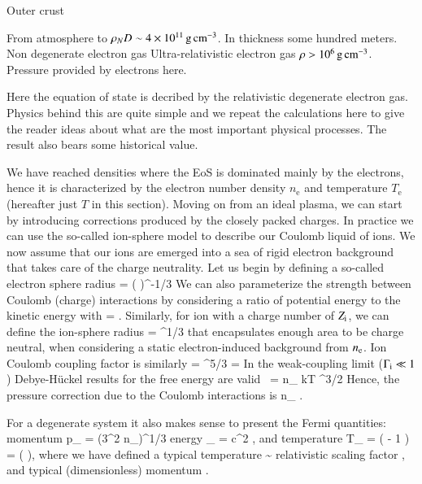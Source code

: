 Outer crust

From atmosphere to $\rho_ND \sim 4 \times 10^{11} \, \mathrm{g}\,\mathrm{cm}^{-3} $.
In thickness some hundred meters.
Non degenerate electron gas
Ultra-relativistic electron gas $\rho > 10^6 \, \mathrm{g}\,\mathrm{cm}^{-3} $.
Pressure provided by electrons here.

Here the equation of state is decribed by the relativistic degenerate electron gas.
Physics behind this are quite simple and we repeat the calculations here to give the reader ideas about what are the most important physical processes.
The result also bears some historical value.

We have reached densities where the EoS is dominated mainly by the electrons, hence it is characterized by the electron number density $n_{\mathrm{e}}$ and temperature $T_{\mathrm{e}}$ (hereafter just $T$ in this section).
Moving on from an ideal plasma, we can start by introducing corrections produced by the closely packed charges.
In practice we can use the so-called ion-sphere model to describe our Coulomb liquid of ions.
We now assume that our ions are emerged into a sea of rigid electron background that takes care of the charge neutrality.
Let us begin by defining a so-called electron sphere radius
\be
\erad = \left(  \right)^{-1/3}
\ee
We can also parameterize the strength between Coulomb (charge) interactions by considering a ratio of potential energy to the kinetic energy with
\be
\Ge = .
\ee
Similarly, for ion with a charge number of $Z_{\mathrm{i}}$, we can define the ion-sphere radius
\be
\irad = \erad \Zi^{1/3}
\ee
that encapsulates enough area to be charge neutral, when considering a static electron-induced background from $n_{\mathrm{e}}$.
Ion Coulomb coupling factor is similarly
\be
\Gi = \Ge \Zi^{5/3} = 
\ee
In the weak-coupling limit ($\Gamma_{\mathrm{i}} \ll 1$) Debye-H\"uckel results for the free energy are valid\cite{LL80}
\be
{} =  n_{} kT \Gamma^{3/2}
\ee
Hence, the pressure correction due to the Coulomb interactions is\cite{DeWitt96}
\be
\Pii {} n_{} .
\ee



For a degenerate system it also makes sense to present the Fermi quantities:
momentum
\be
p_{} = \hbar (3\pi^2 n_{})^{1/3}
\ee
energy
\be
\epsilon_{} = c^2 ,
\ee
and temperature
\be
T_{} =  \left(  - 1 \right)
= \Tr (  ),
\ee
where we have defined a typical temperature
\be
\Tr \equiv {} \sim {} \Kelvin
\ee
relativistic scaling factor
\be
\gammar \equiv {},
\ee
and typical (dimensionless) momentum
\be
\xr \equiv {}.
\ee

